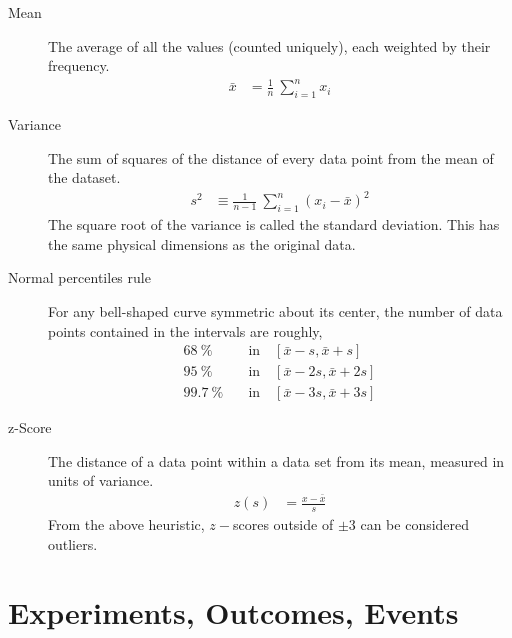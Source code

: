 \begin{description}
    \item[Mean] The average of all the values (counted uniquely),
          each weighted by their frequency.
          \begin{align}
              \bar{x} & = \frac{1}{n}\ \sum_{i=1}^{n} x_i
          \end{align}

    \item[Variance] The sum of squares of the distance of every data point from the
          mean of the dataset.
          \begin{align}
              s^2 & \equiv \frac{1}{n-1}\ \sum_{i=1}^{n} (x_i - \bar{x})^2
          \end{align}
          The square root of the variance is called the standard deviation. This has the
          same physical dimensions as the original data.

    \item[Normal percentiles rule] For any bell-shaped curve symmetric about its center,
          the number of data points contained in the intervals are roughly,
          \begin{align}
              \SI{68}{\percent} \quad   & \text{in} \quad [\bar{x} - s, \bar{x} + s]   \\
              \SI{95}{\percent} \quad   & \text{in} \quad [\bar{x} - 2s, \bar{x} + 2s] \\
              \SI{99.7}{\percent} \quad & \text{in} \quad [\bar{x} - 3s, \bar{x} + 3s]
          \end{align}

    \item[z-Score] The distance of a data point within a data set from its mean,
          measured in units of variance.
          \begin{align}
              z(s) & = \frac{x - \bar{x}}{s}
          \end{align}
          From the above heuristic, $ z-$scores outside of $ \pm 3 $ can be considered
          outliers.
\end{description}

\section{Experiments, Outcomes, Events}

